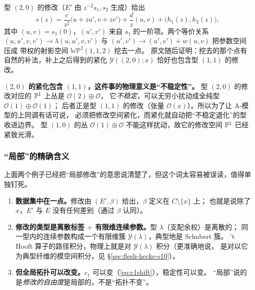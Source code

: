 型 $(2,0)$ 的修改（$E'$ 由 $z^{-2}s_1,s_2$ 生成）给出
\begin{equation}
s(z)=\frac{c}{z^{2}}\bigl(u+zu',v+zv'\bigr)+\frac{d}{z}(u,v)+\bigl(h_1(z),h_2(z)\bigr),
\label{eq:y20}
\end{equation}
其中 $(u,v)=s_1(0)$，$(u',v')$ 来自 $s_1$ 的一阶项。两个等价关系
$(u,u',v,v')\to\lambda(u,u',v,v')$ 与 $(u',v')\to(u',v')+w(u,v)$ 把参数空间压成
带权的射影空间 $\mathbb{WP}^2(1,1,2)$ 挖去一点。
原文随后证明：挖去的那个点有自然的补法，补上之后得到的紧化
$\mathcal{Y}((2,0);x)$ 恰好也包含型 $(1,1)$ 的修改。\pA{}

\begin{keyidea}
\textbf{$(2,0)$ 的紧化包含 $(1,1)$，这件事的物理意义是“不稳定性”。}
型 $(2,0)$ 的修改对应的 $\mathbb{P}^1$ 上丛是 $\mathcal{O}(2)\oplus\mathcal{O}$，
它\emph{不稳定}，可以无穷小扰动成全纯型 $\mathcal{O}(1)\oplus\mathcal{O}(1)$；
后者正是型 $(1,1)$ 的修改（张量 $\mathcal{O}(x)$）。所以为了让 A-模型的上同调有话可说，
必须把修改空间紧化，而紧化就自动把“不稳定退化”的型收进边界。
型 $(1,0)$ 的丛 $\mathcal{O}(1)\oplus\mathcal{O}$ 不能这样扰动，故它的修改空间
$\mathbb{P}^1$ 已经紧致光滑。\pA{}
\end{keyidea}

\subsubsection{“局部”的精确含义}

上面两个例子已经把“局部修改”的意思说清楚了，但这个词太容易被误读，值得单独钉死。
\begin{enumerate}
\item \textbf{数据集中在一点。}修改由 $(E',\beta)$ 给出，$\beta$ 定义在 $C\setminus\{x\}$ 上；
  也就是说除了 $x$，$E'$ 与 $E$ 没有任何差别（通过 $\beta$ 认同）。
\item \textbf{修改的类型是离散标签 $+$ 有限维连续参数。}型 $\lambda$（支配余权）是离散的；
  同一型内的连续参数构成一个有限维簇 $\mathcal{Y}(\lambda)$，典型地是 Schubert 簇。
  't Hooft{} 算子的路径积分，物理上就是对 $\mathcal{Y}(\lambda)$ 积分（更准确地说，
  是对以它为典型纤维的模空间积分，见 §\ref{sec:flesh-hecke-s10}）。
\item \textbf{但全局拓扑可以改变。}$c_1$ 可以变（\eqref{eq:c1shift}），稳定性可以变。
  “局部”说的是\emph{修改的自由度}是局部的，不是“拓扑不变”。
\end{enumerate}


